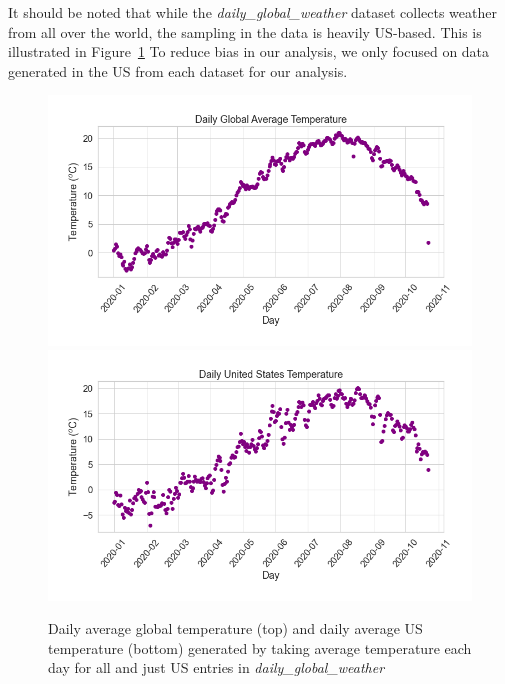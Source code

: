 It should be noted that while the \textit{daily\_global\_weather} dataset collects weather from all over the world, the sampling in the data is heavily US-based. This is illustrated in Figure~\ref{fig:US_bias} To reduce bias in our analysis, we only focused on data generated in the US from each dataset for our analysis. 
\begin{figure}
    \centering
    \includegraphics[width=\columnwidth]{figures/DailyAveTemp.png}
    \includegraphics[width=\columnwidth]{figures/DailyAveUSTemp.png}
    \caption{Daily average global temperature (top) and daily average US temperature (bottom) generated by taking average temperature each day for all and just US entries in \textit{daily\_global\_weather}}
    \label{fig:US_bias}
\end{figure}
